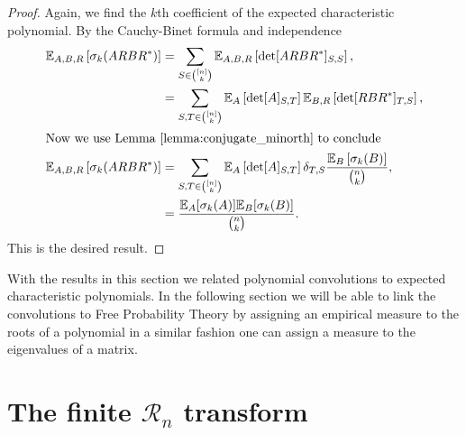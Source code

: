 



\begin{proof}
Again, we find the $k$th coefficient of the expected characteristic polynomial. By the Cauchy-Binet formula and independence
    \begin{align*}
        \mathbb E_{A,B,R} \left[\sigma_k(ARBR^*)\right] &= \sum_{S \in \binom{[n]}{k}} \mathbb E_{A,B,R} \left[\det[ARBR^*]_{S,S}\right],\\ 
        &= \sum_{S,T \in \binom{[n]}{k}} \mathbb E_A\left[ \det[A]_{S,T} \right] \mathbb E_{B,R} \left[ \det [RBR^*]_{T,S} \right],\\ 
        \intertext{Now we use Lemma \ref{lemma:conjugate_minorth} to conclude}
        \mathbb E_{A,B,R} \left[\sigma_k(ARBR^*)\right] &= \sum_{S,T \in \binom{[n]}{k}} \mathbb E_A\left[\det[A]_{S,T} \right] \delta_{T,S}\frac{\mathbb E_B\left[ \sigma_k(B)\right]}{\binom{n}{k}},\\
        &= \frac{\mathbb E_A[\sigma_k(A)]\mathbb E_B[\sigma_k(B)]}{\binom{n}{k}}.
    \end{align*}
    This is the desired result.
\end{proof}




With the results in this section we related polynomial convolutions to expected characteristic polynomials. In the following section we will be able to link the convolutions to Free Probability Theory by assigning an empirical measure to the roots of a polynomial in a similar fashion one can assign a measure to the eigenvalues of a matrix.


\section{The finite \texorpdfstring{$\mathcal R_n$}{R_n} transform} 

